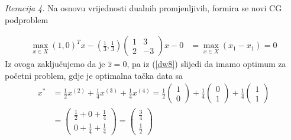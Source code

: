 \documentclass[b5paper, utf8, 11pt, colorlinks]{book}
\theoremstyle{definition}
\begin{document}
\vspace{5mm}

\emph{Iteracija 4.} Na osnovu vrijednosti dualnih promjenljivih, formira se novi CG podproblem
 
	 \begin{align*}
		\max_{x \in X} (1, 0)^T x - \left(\frac{1}{3}, \frac{1}{3}\right)\left(\begin{array}{cc}
			1 & 3 \\
			2 & -3
		\end{array}\right)  x   - 0 &= \max_{x \in X} (x_1  - x_1 ) = 0    
	\end{align*} 
  Iz ovoga zaključujemo da je $\hat{z}=0$, pa iz (\ref{dw8}) slijedi da imamo optimum za početni problem, gdje je optimalna tačka data sa 
\begin{align*}
  	 x^* &= \frac{1}{2}  x^{(2)}+ \frac{1}{4} x^{(3)} + \frac{1}{4} x^{(4)} 
  	     = \frac{1}{2} \begin{pmatrix}
  	     	      1 \\
  	     	      0
  	     \end{pmatrix} +
       \frac{1}{4} \begin{pmatrix}
       	                  0 \\
       	                  1
       \end{pmatrix} +
   \frac{1}{4} \begin{pmatrix}
   	                  1 \\
   	                  1
   \end{pmatrix}\\
   &= \begin{pmatrix}
   	        \frac{1}{2} + 0 + \frac{1}{4} \\
   	        0 + \frac{1}{4} + \frac{1}{4}
   \end{pmatrix} = \begin{pmatrix}
         \frac{3}{4} \\
         \frac{1}{2}
  \end{pmatrix}
\end{align*}
\end{document}
